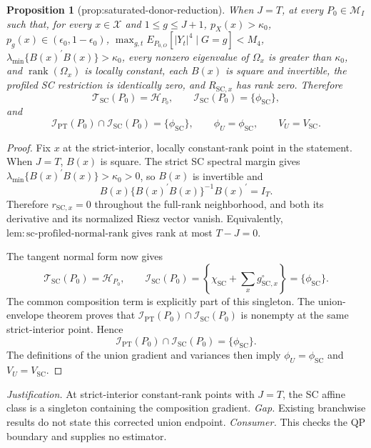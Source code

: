 \documentclass{article}
\newtheorem{proposition}{Proposition}
\begin{document}
\begin{proposition}[prop:saturated-donor-reduction]\label{prop:saturated-donor-reduction}
When \(J=T\), at every \(P_0\in\mathcal M_I\) such that, for every \(x\in\mathcal X\) and \(1\le g\le J+1\), \(p_X(x)>\kappa_0\), \(p_g(x)\in(\epsilon_0,1-\epsilon_0)\), \(\max_{g,t}E_{P_{0,O}}[|Y_t|^4\mid G=g]<M_4\), \(\lambda_{\min}\{B(x)^{\prime}B(x)\}>\kappa_0\), every nonzero eigenvalue of \(\Omega_x\) is greater than \(\kappa_0\), and \(\operatorname{rank}(\Omega_x)\) is locally constant, each \(B(x)\) is square and invertible, the profiled SC restriction is identically zero, and \(R_{\mathrm{SC},x}\) has rank zero. Therefore \[\mathcal T_{\mathrm{SC}}(P_0)=\mathcal H_{P_0},\qquad \mathcal I_{\mathrm{SC}}(P_0)=\{\phi_{\mathrm{SC}}\},\] and \[\mathcal I_{\mathrm{PT}}(P_0)\cap\mathcal I_{\mathrm{SC}}(P_0)=\{\phi_{\mathrm{SC}}\},\qquad \phi_U=\phi_{\mathrm{SC}},\qquad V_U=V_{\mathrm{SC}}.\]
\end{proposition}
\begin{proof}
Fix \(x\) at the strict-interior, locally constant-rank point in the statement.  When \(J=T\), \(B(x)\) is square.  The strict SC spectral margin gives \(\lambda_{\min}\{B(x)^{\prime}B(x)\}>\kappa_0>0\), so \(B(x)\) is invertible and
\[
 B(x)\{B(x)^{\prime}B(x)\}^{-1}B(x)^{\prime}=I_T.
 \tag{1}
\]
Therefore \(r_{\mathrm{SC},x}=0\) throughout the full-rank neighborhood, and both its derivative and its normalized Riesz vector vanish.  Equivalently, \(\mathrm{lem{:}sc\text{-}profiled\text{-}normal\text{-}rank}\) gives rank at most \(T-J=0\).

The tangent normal form now gives
\[
 \mathcal T_{\mathrm{SC}}(P_0)=\mathcal H_{P_0},
 \qquad
 \mathcal I_{\mathrm{SC}}(P_0)
 =\left\{\chi_{\mathrm{SC}}+\sum_xg^{\circ}_{\mathrm{SC},x}\right\}
 =\{\phi_{\mathrm{SC}}\}.
 \tag{2}
\]
The common composition term is explicitly part of this singleton.  The union-envelope theorem proves that \(\mathcal I_{\mathrm{PT}}(P_0)\cap\mathcal I_{\mathrm{SC}}(P_0)\) is nonempty at the same strict-interior point.  Hence
\[
 \mathcal I_{\mathrm{PT}}(P_0)\cap\mathcal I_{\mathrm{SC}}(P_0)
 =\{\phi_{\mathrm{SC}}\}.
 \tag{3}
\]
The definitions of the union gradient and variances then imply \(\phi_U=\phi_{\mathrm{SC}}\) and \(V_U=V_{\mathrm{SC}}\).
\end{proof}
\par\smallskip\noindent \textit{Justification.} At strict-interior constant-rank points with \(J=T\), the SC affine class is a singleton containing the composition gradient. \textit{Gap.} Existing branchwise results do not state this corrected union endpoint. \textit{Consumer.} This checks the QP boundary and supplies no estimator.
\end{document}
